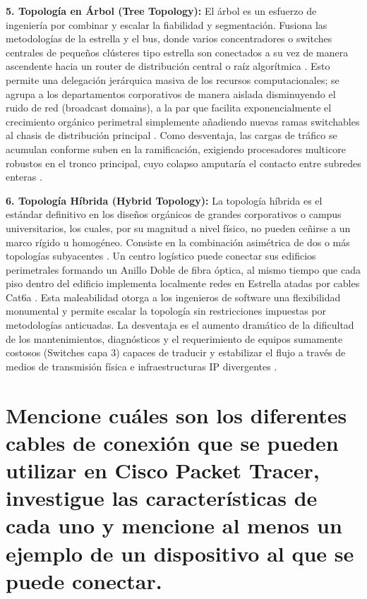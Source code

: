 \documentclass[a4paper,12pt]{article}
\begin{document}
\textbf{5. Topología en Árbol (Tree Topology):}
El árbol es un esfuerzo de ingeniería por combinar y escalar la fiabilidad y segmentación. Fusiona las metodologías de la estrella y el bus, donde varios concentradores o switches centrales de pequeños clústeres tipo estrella son conectados a su vez de manera ascendente hacia un router de distribución central o raíz algorítmica \cite{topology_geeks}. Esto permite una delegación jerárquica masiva de los recursos computacionales; se agrupa a los departamentos corporativos de manera aislada disminuyendo el ruido de red (broadcast domains), a la par que facilita exponencialmente el crecimiento orgánico perimetral simplemente añadiendo nuevas ramas switchables al chasis de distribución principal \cite{topology_geeks}. Como desventaja, las cargas de tráfico se acumulan conforme suben en la ramificación, exigiendo procesadores multicore robustos en el tronco principal, cuyo colapso amputaría el contacto entre subredes enteras \cite{topology_geeks}.

\textbf{6. Topología Híbrida (Hybrid Topology):}
La topología híbrida es el estándar definitivo en los diseños orgánicos de grandes corporativos o campus universitarios, los cuales, por su magnitud a nivel físico, no pueden ceñirse a un marco rígido u homogéneo. Consiste en la combinación asimétrica de dos o más topologías subyacentes \cite{topology_geeks}. Un centro logístico puede conectar sus edificios perimetrales formando un Anillo Doble de fibra óptica, al mismo tiempo que cada piso dentro del edificio implementa localmente redes en Estrella atadas por cables Cat6a \cite{topology_international}. Esta maleabilidad otorga a los ingenieros de software una flexibilidad monumental y permite escalar la topología sin restricciones impuestas por metodologías anticuadas. La desventaja es el aumento dramático de la dificultad de los mantenimientos, diagnósticos y el requerimiento de equipos sumamente costosos (Switches capa 3) capaces de traducir y estabilizar el flujo a través de medios de transmisión física e infraestructuras IP divergentes \cite{topology_international, topology_geeks}.

\section{Mencione cuáles son los diferentes cables de conexión que se pueden utilizar en Cisco Packet Tracer, investigue las características de cada uno y mencione al menos un ejemplo de un dispositivo al que se puede conectar.}
\end{document}
